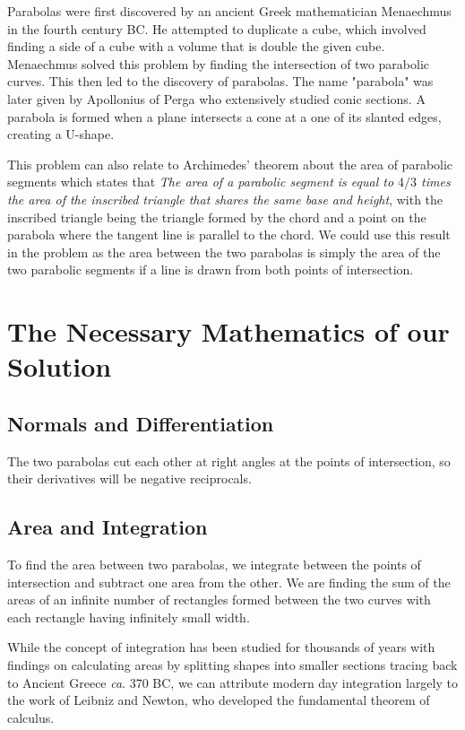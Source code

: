 \documentclass[a4paper,11pt]{article}
\theoremstyle{definition}
\begin{document}
Parabolas were first discovered by an ancient Greek mathematician Menaechmus in the fourth century BC. He attempted to duplicate a cube,  which involved finding a side of a cube with a volume that is double the given cube. Menaechmus solved this problem by finding the intersection of two parabolic curves. This then led to the discovery of parabolas.  The name "parabola" was later given by Apollonius of Perga who extensively studied conic sections. A parabola is formed when a plane intersects a cone at a one of its slanted edges, creating a U-shape.  

This problem can also relate to Archimedes' theorem about the area of parabolic segments which states that \emph{The area of a parabolic segment is equal to $4/3$ times the area of the inscribed triangle that shares the same base and height}, with the inscribed triangle being the triangle formed by the chord and a point on the parabola where the tangent line is parallel to the chord. We could use this result in the problem as the area between the two parabolas is simply the area of the two parabolic segments if a line is drawn from both points of intersection. 
\section{The Necessary Mathematics of our Solution}
\subsection{Normals and Differentiation}
The two parabolas cut each other at right angles at the points of intersection, so their derivatives will be negative reciprocals.
\subsection{Area and Integration}
To find the area between two parabolas, we integrate between the points of intersection and subtract one area from the other. We are finding the sum of the areas of an infinite number of rectangles formed between the two curves with each rectangle having infinitely small width. 

While the concept of integration has been studied for thousands of years with findings on calculating areas by splitting shapes into smaller sections tracing back to Ancient Greece \textit{ca}. 370 BC, we can attribute modern day integration largely to the work of Leibniz and Newton, who developed the fundamental theorem of calculus.
\end{document}
